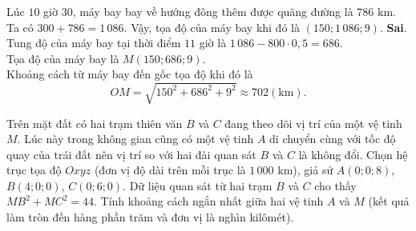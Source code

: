 \begin{ex}
{\begin{itemchoice}
			Lúc $10$ giờ $30$, máy bay bay về hướng đông thêm được quãng đường là $786$ km.\\
			Ta có $300+786=1\,086$. Vậy, tọa độ của máy bay khi đó là $(150; 1\,086;9)$.
			\itemch \textbf{Sai}.\\
			Tung độ của máy bay tại thời điểm $11$ giờ là
			$1\,086-800\cdot 0{,}5=686$.\\
			Tọa độ của máy bay là $M(150;686;9)$.\\
			Khoảng cách từ máy bay đến gốc tọa độ khi đó là
			$$OM=\sqrt{150^2+686^2+9^2}\approx 702(\mathrm{km}).$$
		\end{itemchoice}
	}
\end{ex}

\begin{ex}%
	Trên mặt đất có hai trạm thiên văn $B$ và $C$ đang theo dõi vị trí của một vệ tinh $M$. Lúc này trong không gian cũng có một vệ tinh $A$ di chuyển cùng với tốc độ quay của trái đất nên vị trí so với hai đài quan sát $B$ và $C$ là không đổi. Chọn hệ trục tọa độ $Oxyz$ (đơn vị độ dài trên mỗi trục là $1\,000$ km), giả sử $A(0; 0; 8)$, $B(4; 0; 0)$, $C(0; 6; 0)$. Dữ liệu quan sát từ hai trạm $B$ và $C$ cho thấy $MB^2+MC^2=44$. Tính khoảng cách ngắn nhất giữa hai vệ tinh $A$ và $M$ (kết quả làm tròn đến hàng phần trăm và đơn vị là nghìn kilômét).
\end{ex}


